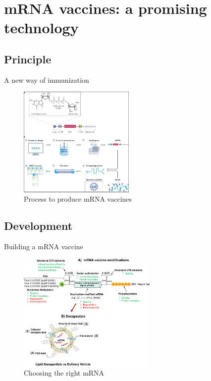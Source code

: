 \section{mRNA vaccines: a promising technology}
\subsection{Principle}

\begin{frame}{A new way of immunization}
    
    \begin{figure}
        \centering
        \includegraphics[width=0.5\textwidth]{imgs/mRNA_Vaccine.JPG}
        \caption{Process to produce mRNA vaccines \autocite{MRNAVaccinesInfectious}}
        \label{fig:mRNAvac}
    \end{figure}
    
\end{frame}

\subsection{Development}

\begin{frame}{Building a mRNA vaccine}
    
    \begin{figure}
        \centering
        \includegraphics[width=0.6\textwidth]{imgs/RNA2.jpg}
        \caption{Choosing the right mRNA \autocite{granados-riveronEngineeringCurrentNucleosidemodified2021}}
        \label{fig:mRNAvac2}
    \end{figure}
    
\end{frame}

